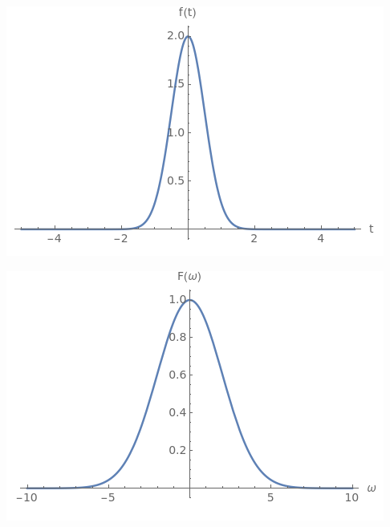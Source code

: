\documentclass[a4paper,12pt]{article}
\begin{document}
\begin{center}
\begin{minipage}{0.48\textwidth}
  \centering
  \includegraphics[width=\linewidth]{images/4f22.png}
\end{minipage}
\hfill
\begin{minipage}{0.48\textwidth}
  \centering
  \includegraphics[width=\linewidth]{images/4F22.png}
\end{minipage}
\end{center}
\end{document}
